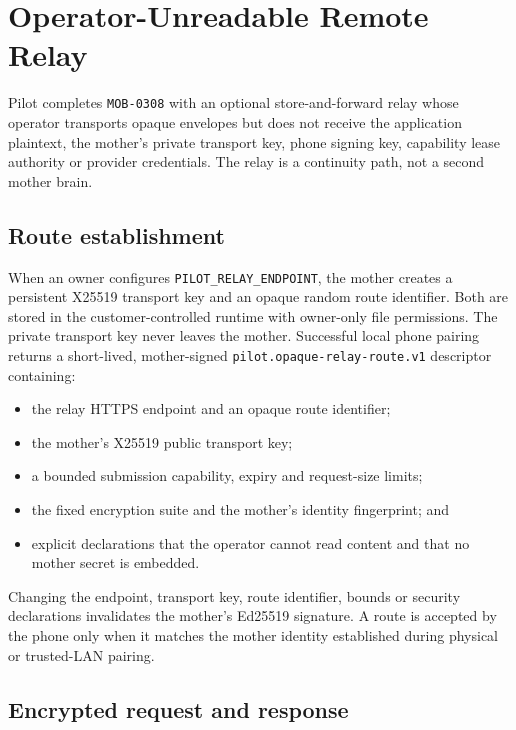 \section{Operator-Unreadable Remote Relay}
\label{sec:pilot-mobile-opaque-relay}

Pilot completes \texttt{MOB-0308} with an optional store-and-forward relay whose
operator transports opaque envelopes but does not receive the application plaintext,
the mother's private transport key, phone signing key, capability lease authority or
provider credentials.  The relay is a continuity path, not a second mother brain.

\subsection{Route establishment}

When an owner configures \texttt{PILOT\_RELAY\_ENDPOINT}, the mother creates a persistent
X25519 transport key and an opaque random route identifier.  Both are stored in the
customer-controlled runtime with owner-only file permissions.  The private transport key
never leaves the mother.  Successful local phone pairing returns a short-lived,
mother-signed \texttt{pilot.opaque-relay-route.v1} descriptor containing:
\begin{itemize}
  \item the relay HTTPS endpoint and an opaque route identifier;
  \item the mother's X25519 public transport key;
  \item a bounded submission capability, expiry and request-size limits;
  \item the fixed encryption suite and the mother's identity fingerprint; and
  \item explicit declarations that the operator cannot read content and that no mother
        secret is embedded.
\end{itemize}

Changing the endpoint, transport key, route identifier, bounds or security declarations
invalidates the mother's Ed25519 signature.  A route is accepted by the phone only when
it matches the mother identity established during physical or trusted-LAN pairing.

\subsection{Encrypted request and response}

